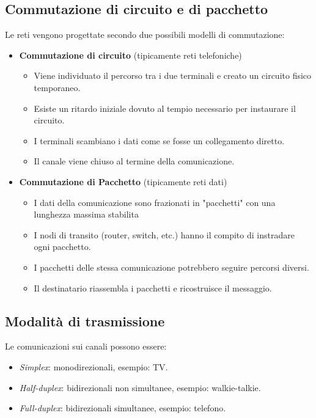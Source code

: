     \subsection{Commutazione di circuito e di pacchetto}
        Le reti vengono progettate secondo due possibili modelli di commutazione:
        \begin{itemize}
            \item \textbf{Commutazione di circuito} (tipicamente reti telefoniche)
            \begin{itemize}
                \item Viene individuato il percorso tra i due terminali e creato un circuito fisico temporaneo.
                \item Esiste un ritardo iniziale dovuto al tempio necessario per instaurare il circuito.
                \item I terminali scambiano i dati come se fosse un collegamento diretto.
                \item Il canale viene chiuso al termine della comunicazione.
            \end{itemize}

            \item \textbf{Commutazione di Pacchetto} (tipicamente reti dati)
            \begin{itemize}
                \item I dati della comunicazione sono frazionati in "pacchetti" con una lunghezza massima stabilita
                \item I nodi di transito (router, switch, etc.) hanno il compito di instradare ogni pacchetto.
                \item I pacchetti delle stessa comunicazione potrebbero seguire percorsi diversi.
                \item Il destinatario riassembla i pacchetti e ricostruisce il messaggio.
            \end{itemize}
        \end{itemize}

    \subsection{Modalità di trasmissione}
        Le comunicazioni sui canali possono essere:
        \begin{itemize}
            \item \textit{Simplex}: monodirezionali, esempio: TV.
            \item \textit{Half-duplex}: bidirezionali non simultanee, esempio: walkie-talkie.
            \item \textit{Full-duplex}: bidirezionali simultanee, esempio: telefono.
        \end{itemize}

